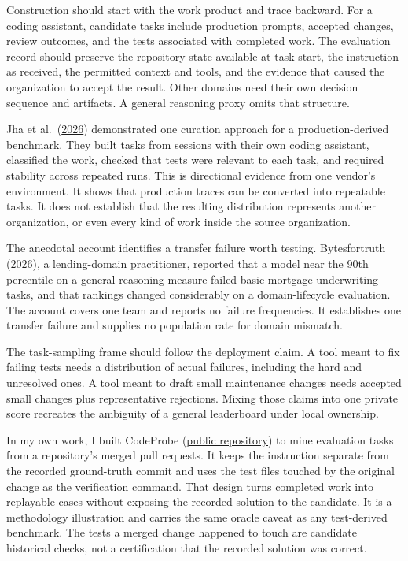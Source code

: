 Construction should start with the work product and trace backward. For a coding assistant, candidate tasks include production prompts, accepted changes, review outcomes, and the tests associated with completed work. The evaluation record should preserve the repository state available at task start, the instruction as received, the permitted context and tools, and the evidence that caused the organization to accept the result. Other domains need their own decision sequence and artifacts. A general reasoning proxy omits that structure.

Jha et al.~(\href{https://arxiv.org/abs/2604.01527}{2026}) demonstrated one curation approach for a production-derived benchmark. They built tasks from sessions with their own coding assistant, classified the work, checked that tests were relevant to each task, and required stability across repeated runs. This is directional evidence from one vendor's environment. It shows that production traces can be converted into repeatable tasks. It does not establish that the resulting distribution represents another organization, or even every kind of work inside the source organization.

The anecdotal account identifies a transfer failure worth testing. Bytesfortruth (\href{https://www.reddit.com/r/compsci/comments/1rqcmu8/}{2026}), a lending-domain practitioner, reported that a model near the 90th percentile on a general-reasoning measure failed basic mortgage-underwriting tasks, and that rankings changed considerably on a domain-lifecycle evaluation. The account covers one team and reports no failure frequencies. It establishes one transfer failure and supplies no population rate for domain mismatch.

The task-sampling frame should follow the deployment claim. A tool meant to fix failing tests needs a distribution of actual failures, including the hard and unresolved ones. A tool meant to draft small maintenance changes needs accepted small changes plus representative rejections. Mixing those claims into one private score recreates the ambiguity of a general leaderboard under local ownership.

In my own work, I built CodeProbe (\href{https://github.com/sjarmak/codeprobe}{public repository}) to mine evaluation tasks from a repository's merged pull requests. It keeps the instruction separate from the recorded ground-truth commit and uses the test files touched by the original change as the verification command. That design turns completed work into replayable cases without exposing the recorded solution to the candidate. It is a methodology illustration and carries the same oracle caveat as any test-derived benchmark. The tests a merged change happened to touch are candidate historical checks, not a certification that the recorded solution was correct.

